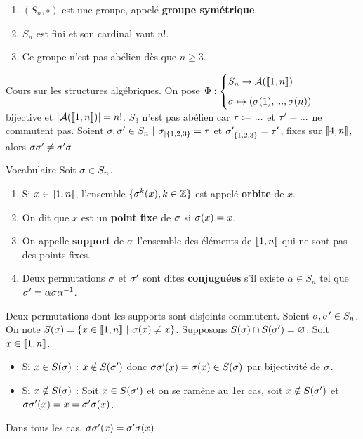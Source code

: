 \documentclass[11pt]{article}
\begin{document}
\begin{prop}{}{}
    \begin{enumerate}[topsep=0pt,itemsep=-0.9 ex]
        \item $(S_n, \circ)$ est une groupe, appelé \textbf{groupe symétrique}.
        \item $S_n$ est fini et son cardinal vaut $n!$.
        \item Ce groupe n'est pas abélien dès que $n\geq3$.
    \end{enumerate}
    \tcblower
     Cours sur les structures algébriques.\n
     On pose $\Phi:\begin{cases}S_n \to \mathcal{A}(\lb1,n\rb)\n\s\mapsto(\s(1),...,\s(n))\end{cases}$ bijective et $|\mathcal{A}(\llbracket1,n\rrbracket)|=n!$.\n
     $S_3$ n'est pas abélien car $\tau:=...$ et $\tau'=...$ ne commutent pas.\n
    Soient $\sigma,\sigma'\in S_n ~ | ~ \sigma_{|\{1,2,3\}}=\tau$ et $\sigma'_{|\{1,2,3\}}=\tau'$, fixes sur $\llbracket4,n\rrbracket$, alors $\sigma\sigma'\neq\sigma'\sigma$.
\end{prop}

\begin{defi}{Vocabulaire}{}
    Soit $\sigma\in S_n$.
    \begin{enumerate}[topsep=0pt,itemsep=-0.9 ex]
        \item Si $x\in\llbracket1,n\rrbracket$, l'ensemble $\{\sigma^k(x),k\in\mathbb{Z}\}$ est appelé \textbf{orbite} de $x$.
        \item On dit que $x$ est un \textbf{point fixe} de $\sigma$ si $\sigma(x)=x$. 
        \item On appelle \textbf{support} de $\sigma$ l'ensemble des éléments de $\llbracket1,n\rrbracket$ qui ne sont pas des points fixes.
        \item Deux permutations $\sigma$ et $\sigma'$ sont dites \textbf{conjuguées} s'il existe $\alpha\in S_n$ tel que $\sigma'=\alpha\sigma\alpha^{-1}$.
    \end{enumerate}

\end{defi}

\begin{prop}{}{}
    Deux permutations dont les supports sont disjoints commutent.
    \tcblower
    Soient $\sigma,\sigma'\in S_n$. On note $S(\sigma)=\{x \in \llbracket1,n\rrbracket ~ | ~ \sigma(x)\neq x\}$.\n
    Supposons $S(\sigma)\cap S(\sigma') = \varnothing$.\n
    Soit $x\in\llbracket1,n\rrbracket$.\n
    \begin{itemize}
        \item Si $x\in S(\sigma)$ : $x\notin S(\sigma')$ donc $\sigma\sigma'(x)=\sigma(x)\in S(\sigma)$ par bijectivité de $\sigma$.
        \item Si $x\notin S(\sigma)$ : Soit $x\in S(\sigma')$ et on se ramène au 1er cas, soit $x\notin S(\sigma')$ et $\sigma\sigma'(x)=x=\sigma'\sigma(x)$.
    \end{itemize}
    Dans tous les cas, $\sigma\sigma'(x)=\sigma'\sigma(x)$
\end{prop}
\end{document}
